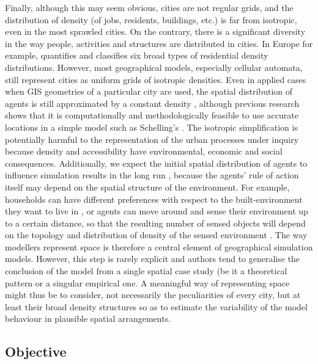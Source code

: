 \documentclass[3p,times,procedia]{elsarticle}
\begin{document}
Finally, although this may seem obvious, cities are not regular grids, and the distribution of density (of jobs, residents, buildings, etc.) is far from isotropic, even in the most sprawled cities. On the contrary, there is a significant diversity in the way people, activities and structures are distributed in cities. In Europe for example, \citet{LeNechet2015} quantifies and classifies six broad types of residential density distributions. However, most geographical models, especially cellular automata, still represent cities as uniform grids of isotropic densities. Even in applied cases when GIS geometries of a particular city are used, the spatial distribution of agents is still approximated by a constant density \citep{arribas2014diverse}, although previous research shows that it is computationally and methodologically feasible to use accurate locations in a simple model such as Schelling's \citep{benenson2002entity}. The isotropic simplification is potentially harmful to the representation of the urban processes under inquiry because density and accessibility have environmental, economic and social consequences. Additionally, we expect the initial spatial distribution of agents to influence simulation results in the long run \citep{Castellanoetal2009}, because the agents' rule of action itself may depend on the spatial structure of the environment. For example, households can have different preferences with respect to the built-environment they want to live in \citep{SpielmanHarrison2014}, or agents can move around and sense their environment up to a certain distance, so that the resulting number of sensed objects will depend on the topology \citep{Banos2012} and distribution of density of the sensed environment \citep{LauriJaggi2003, FossettDietrich2009}. The way modellers represent space is therefore a central element of geographical simulation models. However, this step is rarely explicit and authors tend to generalise the conclusion of the model from a single spatial case study (be it a theoretical pattern or a singular empirical one. A meaningful way of representing space might thus be to consider, not necessarily the peculiarities of every city, but at least their broad density structures so as to estimate the variability of the model behaviour in plausible spatial arrangements.

\subsection{Objective}
\end{document}
